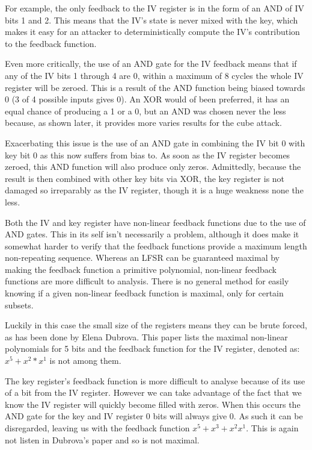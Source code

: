 \documentclass{report}
\begin{document}
For example, the only feedback to the IV register is in the form of an AND of IV bits 1 and 2. This means that the IV's state is never mixed with the key, which makes it easy for an attacker to deterministically compute the IV's contribution to the feedback function.

Even more critically, the use of an AND gate for the IV feedback means that if any  of the IV bits 1 through 4 are 0, within a maximum of 8 cycles the whole IV register will be zeroed. This is a result of the AND function being biased towards 0 (3 of 4 possible inputs gives 0). An XOR would of been preferred, it has an equal chance of producing a 1 or a 0, but an AND was chosen never the less because, as shown later, it provides more varies results for the cube attack.

Exacerbating this issue is the use of an AND gate in combining the IV bit 0 with key bit 0 as this now suffers from bias to. As soon as the IV register becomes zeroed, this AND function will also produce only zeros. Admittedly, because the result is then combined with other key bits via XOR, the key register is not damaged so irreparably as the IV register, though it is a huge weakness none the less.

Both the IV and key register have non-linear feedback functions due to the use of AND gates. This in its self isn't necessarily a problem, although it does make it somewhat harder to verify that the feedback functions provide a maximum length non-repeating sequence. Whereas an LFSR can be guaranteed maximal by making the feedback function a primitive polynomial, non-linear feedback functions are more difficult to analysis. There is no general method for easily knowing if a given non-linear feedback function is maximal, only for certain subsets\cite{nlfsrFeedback}.

Luckily in this case the small size of the registers means they can be brute forced, as has been done by Elena Dubrova\cite{nlfsrFeedback}. This paper lists the maximal non-linear polynomials for 5 bits and the feedback function for the IV register, denoted as: $x^5+x^2*x^1$ is not among them. 

The key register's feedback function is more difficult to analyse because of its use of a bit from the IV register. However we can take advantage of the fact that we know the IV register will quickly become filled with zeros. When this occurs the  AND gate for the key and IV register 0 bits will always give 0. As such it can be disregarded, leaving us with the feedback function $x^5+x^3+x^2x^1$. This is again not listen in Dubrova's paper and so is not maximal.
\newpage
\end{document}
